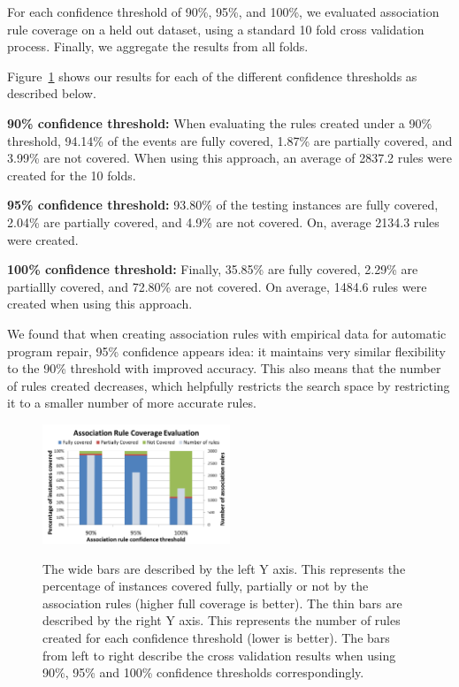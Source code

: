 \documentclass[sigconf]{acmart}
\begin{document}
For each confidence
threshold of 90\%, 95\%, and 100\%, we evaluated association rule coverage on a held out
dataset, using 
a standard 10 fold cross validation process. Finally, we aggregate the results
from all folds.

Figure~\ref{ruleEvaluation} shows our results for each of the 
different confidence thresholds as described below.

\vspace{1em}
\noindent\textbf{90\% confidence threshold:}
When evaluating the rules created under a 90\% threshold, 94.14\% of the 
events are fully covered, 1.87\% are partially covered, and 3.99\% are
not covered. When using this approach, an average of 2837.2 rules were
created for the 10 folds.

\vspace{1em}
\noindent\textbf{95\% confidence threshold:}
93.80\% of the testing instances are fully covered, 2.04\% are
partially covered, and 4.9\% are not covered. On, average 2134.3 rules
were created.

\vspace{1em}
\noindent\textbf{100\% confidence threshold:}
Finally, 35.85\% are fully
covered, 2.29\% are partiallly covered, and 72.80\% are not covered.
On average, 1484.6 rules were created when using this approach.

\vspace{1em}
We found that when creating association
rules with empirical data for automatic program repair, 95\% confidence appears
idea: 
it maintains very similar flexibility 
to the 90\% threshold with improved accuracy.
This also means that the number of rules created decreases, which helpfully
restricts 
the search space by restricting it to a smaller number of more accurate rules.
 

\begin{figure}[h]
\caption{The wide bars are described by the left Y axis. This represents
the percentage of instances covered
fully, partially or not by the association rules (higher full coverage is better). 
The thin bars are described by the right Y axis.
This represents the number of rules created for each confidence threshold 
(lower is better).
The bars from left to right describe the cross validation
results when using 90\%, 95\% and 100\% confidence thresholds correspondingly.}
\centering
\includegraphics[width=0.5\textwidth]{images/assocRuleEval.png}
\label{ruleEvaluation}
\end{figure}
\end{document}
